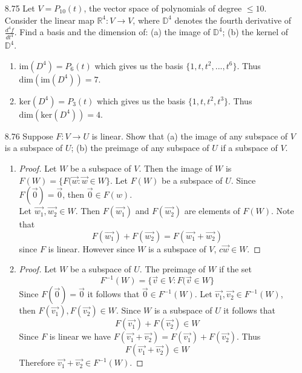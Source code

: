 \documentclass[12pt]{article}
\theoremstyle{definition}
\theoremstyle{plain}
\begin{document}
\begin{enumerate}
\item[8.75] Let $V=P_{10}(t)$, the vector space of polynomials of degree $\leq 10$. Consider the linear map $\mathbb{R}^4: V\rightarrow V$, where $\mathbb{D}^4$ denotes the fourth derivative of $\frac{d^4f}{dt^4}$. Find a basis and the dimension of: (a) the image of $\mathbb{D}^4$; (b) the kernel of $\mathbb{D}^4$.
	\begin{enumerate}
	\item $\mathrm{im}(D^4) = P_6(t)$ which gives us the basis $\{1,t,t^2,...,t^6\}$. Thus $\mathrm{dim}(\mathrm{im}(D^4))=7$.
	\item $\mathrm{ker}(D^4)=P_3(t)$ which gives us the basis $\{1,t,t^2,t^3\}$. Thus $\mathrm{dim}(\mathrm{ker}(D^4))=4$.
	\end{enumerate}		

\item[8.76] Suppose $F:V\rightarrow U$ is linear. Show that (a) the image of any subspace of $V$ is a subspace of $U$; (b) the preimage of any subspace of $U$ if a subspace of $V$.
	\begin{enumerate}
	\item 
	\begin{proof}
	Let $W$ be a subspace of $V$. Then the image of $W$ is $F(W)=\{F(\vec{w}: \vec{w}\in W\}$. Let $F(W)$ be a subspace of $U$. Since $F(\vec{0})=\vec{0}$, then $\vec{0}\in F(w)$.\\
	Let $\vec{w_1},\vec{w_2} \in W$. Then $F(\vec{w_1})$ and $F(\vec{w_2})$ are elements of $F(W)$. Note that
	\[ F(\vec{w_1}) + F(\vec{w_2}) = F(\vec{w_1}+\vec{w_2}) \]
	since $F$ is linear. However since $W$ is a subspace of $V$, $c\vec{w}\in W$.
	\end{proof}
	\item 
	\begin{proof}
	Let $W$ be a subspace of $U$. The preimage of $W$ if the set
	\[ F^{-1}(W) = \{\vec{v}\in V: F(\vec{v} \in W\} \]
	Since $F(\vec{0})=\vec{0}$ it follows that $\vec{0}\in F^{-1}(W)$. Let $\vec{v_1},\vec{v_2}\in F^{-1}(W)$, then $F(\vec{v_1}),F(\vec{v_2})\in W$. Since $W$ is a subspace of $U$ it follows that
	\[ F(\vec{v_1})+F(\vec{v_2})\in W \]
	Since $F$ is linear we have $F(\vec{v_1}+\vec{v_2})=F(\vec{v_1})+F(\vec{v_2})$. Thus
	\[ F(\vec{v_1}+\vec{v_2})\in W \]
	Therefore $\vec{v_1}+\vec{v_2}\in F^{-1}(W)$.
	\end{proof}
	\end{enumerate}


\end{enumerate}
\end{document}
